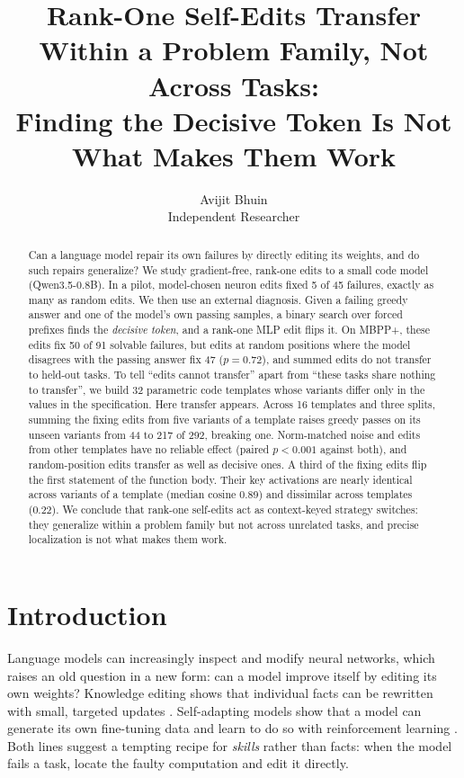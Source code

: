 \documentclass[11pt]{article}
\title{Rank-One Self-Edits Transfer Within a Problem Family, Not Across Tasks:\\
Finding the Decisive Token Is Not What Makes Them Work}
\author{Avijit Bhuin\\ \small Independent Researcher}
\date{}
\begin{document}
\maketitle

\begin{abstract}
Can a language model repair its own failures by directly editing its weights, and do such repairs generalize? We study gradient-free, rank-one edits to a small code model (Qwen3.5-0.8B). In a pilot, model-chosen neuron edits fixed 5 of 45 failures, exactly as many as random edits. We then use an external diagnosis. Given a failing greedy answer and one of the model's own passing samples, a binary search over forced prefixes finds the \emph{decisive token}, and a rank-one MLP edit flips it. On MBPP+, these edits fix 50 of 91 solvable failures, but edits at random positions where the model disagrees with the passing answer fix 47 ($p{=}0.72$), and summed edits do not transfer to held-out tasks. To tell ``edits cannot transfer'' apart from ``these tasks share nothing to transfer'', we build 32 parametric code templates whose variants differ only in the values in the specification. Here transfer appears. Across 16 templates and three splits, summing the fixing edits from five variants of a template raises greedy passes on its unseen variants from 44 to 217 of 292, breaking one. Norm-matched noise and edits from other templates have no reliable effect (paired $p<0.001$ against both), and random-position edits transfer as well as decisive ones. A third of the fixing edits flip the first statement of the function body. Their key activations are nearly identical across variants of a template (median cosine 0.89) and dissimilar across templates (0.22). We conclude that rank-one self-edits act as context-keyed strategy switches: they generalize within a problem family but not across unrelated tasks, and precise localization is not what makes them work.
\end{abstract}

\section{Introduction}
Language models can increasingly inspect and modify neural networks, which raises an old question in a new form: can a model improve itself by editing its own weights? Knowledge editing shows that individual facts can be rewritten with small, targeted updates \citep{meng2022rome,meng2023memit,mitchell2022mend,fang2025alphaedit}. Self-adapting models show that a model can generate its own fine-tuning data and learn to do so with reinforcement learning \citep{zweiger2025seal}. Both lines suggest a tempting recipe for \emph{skills} rather than facts: when the model fails a task, locate the faulty computation and edit it directly.
\end{document}
